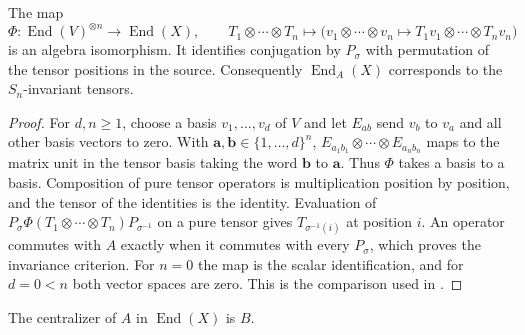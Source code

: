 \begin{lemma}
\label{res:D02}
The map
\[
 \Phi\colon\operatorname{End}(V)^{\otimes n}\longrightarrow
                 \operatorname{End}(X),\qquad
 T_1\otimes\cdots\otimes T_n\longmapsto
 \bigl(v_1\otimes\cdots\otimes v_n\mapsto T_1v_1\otimes\cdots\otimes T_nv_n\bigr)
\]
is an algebra isomorphism. It identifies conjugation by \(P_\sigma\)
with permutation of the tensor positions in the source.
Consequently \(\operatorname{End}_{A}(X)\) corresponds to the
\(S_n\)-invariant tensors.
\end{lemma}

\begin{proof}
For \(d,n\geq1\), choose a basis \(v_1,\ldots,v_d\) of \(V\)
and let \(E_{ab}\) send \(v_b\) to \(v_a\) and all other basis
vectors to zero. With \(\mathbf a,\mathbf b\in\{1,\ldots,d\}^n\),
\(E_{a_1b_1}\otimes\cdots\otimes E_{a_nb_n}\) maps to the matrix
unit in the tensor basis taking the word \(\mathbf b\) to
\(\mathbf a\). Thus \(\Phi\) takes a basis to a basis.
Composition of pure tensor operators is multiplication position
by position, and the tensor of the identities is the identity.
Evaluation of \(P_\sigma\Phi(T_1\otimes\cdots\otimes T_n)P_{\sigma^{-1}}\)
on a pure tensor gives \(T_{\sigma^{-1}(i)}\) at position \(i\).
An operator commutes with \(A\) exactly when it commutes with
every \(P_\sigma\), which proves the invariance criterion.
For \(n=0\) the map is the scalar identification, and for \(d=0<n\)
both vector spaces are zero. This is the comparison used in
\cite[Theorem 4.55]{etingof}.
\end{proof}

\begin{theorem}
\label{res:D03}
The centralizer of \(A\) in \(\operatorname{End}(X)\) is \(B\).
\end{theorem}

